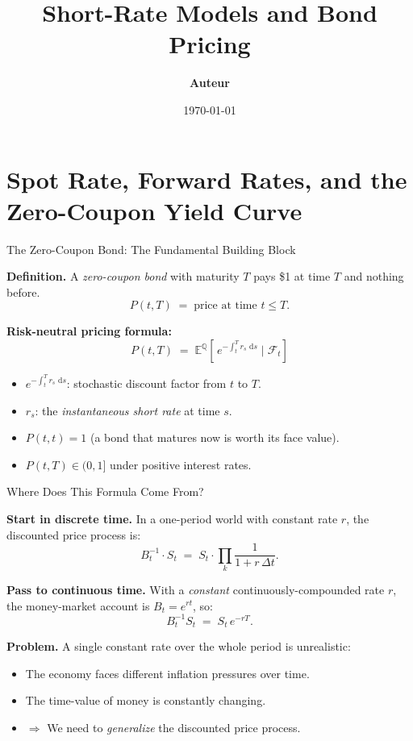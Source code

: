 \documentclass[compress]{beamer}
\title[CIR \& Bond Pricing]{Short-Rate Models and Bond Pricing}
\author[\textbf{Auteur}]{\textbf{Auteur}}
\date{\today}
\newcommand{\QQ}{\mathbb{Q}}
\newcommand{\EE}{\mathbb{E}}
\newcommand{\FF}{\mathcal{F}}
\newcommand{\dd}{\,\mathrm{d}}
\begin{document}


\begin{frame}
	\titlepage
\end{frame}

{\AtBeginSection{}}

\section{Spot Rate, Forward Rates, and the Zero-Coupon Yield Curve}

\begin{frame}{The Zero-Coupon Bond: The Fundamental Building Block}

\textbf{Definition.} A \textit{zero-coupon bond} with maturity $T$ pays \$1 at time $T$ and nothing before.
\[
	P(t,T) \;=\; \text{price at time } t \le T.
\]

\medskip
\textbf{Risk-neutral pricing formula:}
\[
	\boxed{P(t,T) \;=\; \EE^{\QQ}\!\left[\,e^{-\int_t^T r_s\,\dd s}\;\Big|\;\FF_t\right]}
\]

\medskip
\begin{itemize}
	\item $e^{-\int_t^T r_s\,\dd s}$: stochastic discount factor from $t$ to $T$.
	\item $r_s$: the \textit{instantaneous short rate} at time $s$.
	\item $P(t,t) = 1$ (a bond that matures now is worth its face value).
	\item $P(t,T) \in (0,1]$ under positive interest rates.
\end{itemize}

\end{frame}

\begin{frame}{Where Does This Formula Come From?}

\textbf{Start in discrete time.}  In a one-period world with constant rate $r$, the discounted price process is:
\[
	B_t^{-1} \cdot S_t \;=\; S_t \cdot \prod_{k} \frac{1}{1+r\,\Delta t}.
\]

\medskip
\textbf{Pass to continuous time.}  With a \textit{constant} continuously-compounded rate $r$, the money-market account is $B_t = e^{rt}$, so:
\[
	B_t^{-1} S_t \;=\; S_t\,e^{-rT}.
\]

\medskip
\textbf{Problem.}  A single constant rate over the whole period is unrealistic:
\begin{itemize}
	\item The economy faces different inflation pressures over time.
	\item The time-value of money is constantly changing.
	\item $\Rightarrow$ We need to \textit{generalize} the discounted price process.
\end{itemize}

\end{frame}
\end{document}
